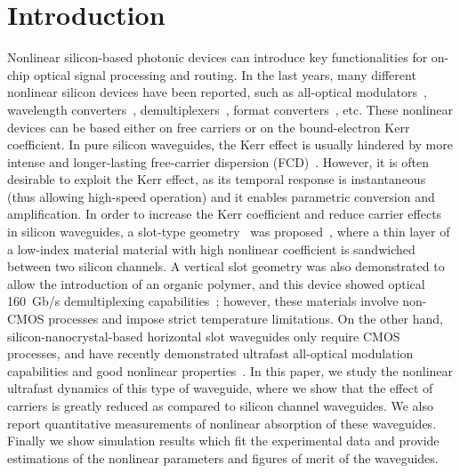 \section{Introduction}
Nonlinear silicon-based photonic devices can introduce key functionalities for on-chip optical signal processing and routing. In the last years, many different nonlinear silicon devices have been reported, such as all-optical modulators~\cite{Almeida2004b}, wavelength converters~\cite{Lee2009,Driscoll2010}, demultiplexers~\cite{Koos2009}, format converters~\cite{Astar2010}, etc.
These nonlinear devices can be based either on free carriers or on the bound-electron Kerr coefficient.
In pure silicon waveguides, the Kerr effect is usually hindered by more intense and longer-lasting free-carrier dispersion (FCD)~\cite{Foster2008,Osgood2009}. However, it is often desirable to exploit the Kerr effect, as its temporal response is instantaneous (thus allowing high-speed operation) and it enables parametric conversion and amplification. In order to increase the Kerr coefficient and reduce carrier effects in silicon waveguides, a slot-type geometry~\cite{Almeida2004} was proposed~\cite{Sanchis2007,Koos2007a,Zhang2010,Rukhlenko2012}, where a thin layer of a low-index material material with high nonlinear coefficient is sandwiched between two silicon channels.
A vertical slot geometry was also demonstrated to allow the introduction of an organic polymer, and this device showed optical 160~Gb/s demultiplexing capabilities~\cite{Koos2009}; however, these materials involve non-CMOS processes and impose strict temperature limitations.
On the other hand, silicon-nanocrystal-based horizontal slot waveguides only require CMOS processes, and have recently demonstrated ultrafast all-optical modulation capabilities and good nonlinear properties~\cite{Spano2009, Martinez2010a, Oton2010, Trita2011}.
In this paper, we study the nonlinear ultrafast dynamics of this type of waveguide, where we show that the effect of carriers is greatly reduced as compared to silicon channel waveguides. We also report quantitative measurements of nonlinear absorption of these waveguides.
Finally we show simulation results which fit the experimental data and provide estimations of the nonlinear parameters and figures of merit of the waveguides.


